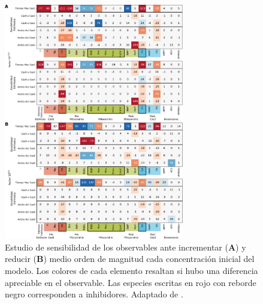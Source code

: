 \begin{figure}[t!]
    \centering
    \includegraphics[width=0.7\textwidth]{img/cap_4/sensitivity_05.pdf}
    \caption{\footnotesize{Estudio de sensibilidad de los observables ante incrementar (\textbf{A}) y reducir (\textbf{B}) medio orden de magnitud cada concentración inicial del modelo. Los colores de cada elemento resaltan si hubo una diferencia apreciable en el observable. Las especies escritas en rojo con reborde negro corresponden a inhibidores. Adaptado de \cite{Corbat2021}.}}
    \label{fig:sensitividad05}
\end{figure}


